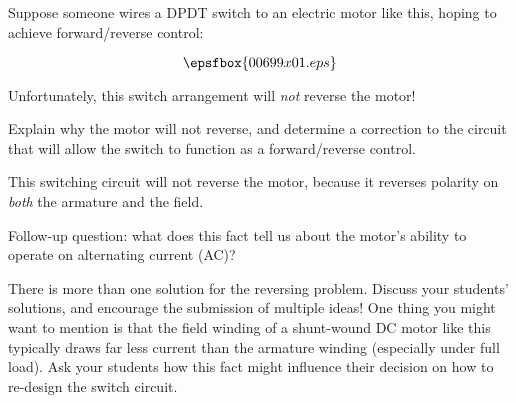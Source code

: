 

Suppose someone wires a DPDT switch to an electric motor like this, hoping to achieve forward/reverse control:

$$\epsfbox{00699x01.eps}$$

Unfortunately, this switch arrangement will {\it not} reverse the motor!

\vskip 10pt

Explain why the motor will not reverse, and determine a correction to the circuit that will allow the switch to function as a forward/reverse control.







This switching circuit will not reverse the motor, because it reverses polarity on {\it both} the armature and the field.

\vskip 10pt

Follow-up question: what does this fact tell us about the motor's ability to operate on alternating current (AC)?







There is more than one solution for the reversing problem.  Discuss your students' solutions, and encourage the submission of multiple ideas!  One thing you might want to mention is that the field winding of a shunt-wound DC motor like this typically draws far less current than the armature winding (especially under full load).  Ask your students how this fact might influence their decision on how to re-design the switch circuit.




